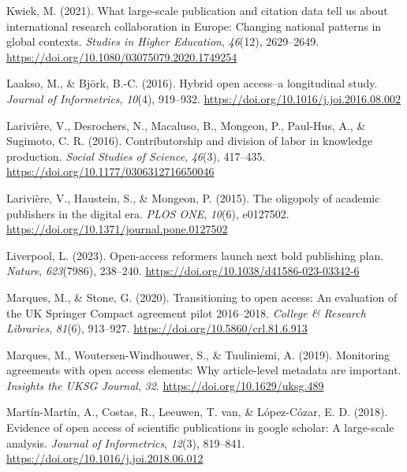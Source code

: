 \documentclass[a4paper,man,floatsintext,longtable,noextraspace,12pt]{apa6}
\newenvironment{CSLReferences}%
  {}%
  {\par}
\begin{document}
\begin{CSLReferences}{1}{0}
\leavevmode{}%
Kwiek, M. (2021). What large-scale publication and citation data tell us
about international research collaboration in {Europe}: Changing
national patterns in global contexts. \emph{Studies in Higher
Education}, \emph{46}(12), 2629--2649.
\url{https://doi.org/10.1080/03075079.2020.1749254}

\leavevmode{}%
Laakso, M., \& Björk, B.-C. (2016). Hybrid open access--a longitudinal
study. \emph{Journal of Informetrics}, \emph{10}(4), 919--932.
\url{https://doi.org/10.1016/j.joi.2016.08.002}

\leavevmode{}%
Larivière, V., Desrochers, N., Macaluso, B., Mongeon, P., Paul-Hus, A.,
\& Sugimoto, C. R. (2016). Contributorship and division of labor in
knowledge production. \emph{Social Studies of Science}, \emph{46}(3),
417--435. \url{https://doi.org/10.1177/0306312716650046}

\leavevmode{}%
Larivière, V., Haustein, S., \& Mongeon, P. (2015). The oligopoly of
academic publishers in the digital era. \emph{{PLOS} {ONE}},
\emph{10}(6), e0127502.
\url{https://doi.org/10.1371/journal.pone.0127502}

\leavevmode{}%
Liverpool, L. (2023). Open-access reformers launch next bold publishing
plan. \emph{Nature}, \emph{623}(7986), 238--240.
\url{https://doi.org/10.1038/d41586-023-03342-6}

\leavevmode{}%
Marques, M., \& Stone, G. (2020). Transitioning to open access: An
evaluation of the {UK} {Springer Compact} agreement pilot 2016--2018.
\emph{College {\&} Research Libraries}, \emph{81}(6), 913--927.
\url{https://doi.org/10.5860/crl.81.6.913}

\leavevmode{}%
Marques, M., Woutersen-Windhouwer, S., \& Tuuliniemi, A. (2019).
Monitoring agreements with open access elements: Why article-level
metadata are important. \emph{Insights the {UKSG} Journal}, \emph{32}.
\url{https://doi.org/10.1629/uksg.489}

\leavevmode{}%
Martín-Martín, A., Costas, R., Leeuwen, T. van, \& López-Cózar, E. D.
(2018). Evidence of open access of scientific publications in google
scholar: A large-scale analysis. \emph{Journal of Informetrics},
\emph{12}(3), 819--841. \url{https://doi.org/10.1016/j.joi.2018.06.012}


\end{CSLReferences}
\end{document}
